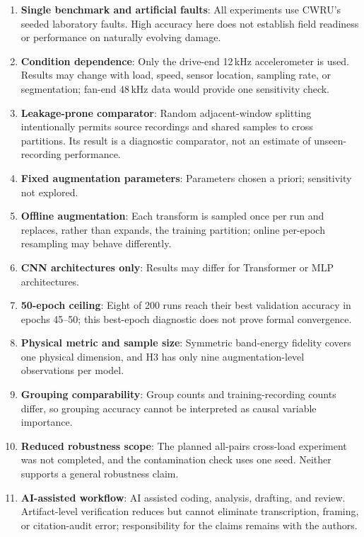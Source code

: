 ﻿\documentclass[11pt,a4paper]{article}
\begin{document}
\begin{enumerate}[nosep]
    \item \textbf{Single benchmark and artificial faults}: All experiments use CWRU's seeded laboratory faults. High accuracy here does not establish field readiness or performance on naturally evolving damage.
    \item \textbf{Condition dependence}: Only the drive-end 12\,kHz accelerometer is used. Results may change with load, speed, sensor location, sampling rate, or segmentation; fan-end 48\,kHz data would provide one sensitivity check.
    \item \textbf{Leakage-prone comparator}: Random adjacent-window splitting intentionally permits source recordings and shared samples to cross partitions. Its result is a diagnostic comparator, not an estimate of unseen-recording performance.
    \item \textbf{Fixed augmentation parameters}: Parameters chosen a priori; sensitivity not explored.
    \item \textbf{Offline augmentation}: Each transform is sampled once per run and replaces, rather than expands, the training partition; online per-epoch resampling may behave differently.
    \item \textbf{CNN architectures only}: Results may differ for Transformer or MLP architectures.
    \item \textbf{50-epoch ceiling}: Eight of 200 runs reach their best validation accuracy in epochs 45--50; this best-epoch diagnostic does not prove formal convergence.
    \item \textbf{Physical metric and sample size}: Symmetric band-energy fidelity covers one physical dimension, and H3 has only nine augmentation-level observations per model.
    \item \textbf{Grouping comparability}: Group counts and training-recording counts differ, so grouping accuracy cannot be interpreted as causal variable importance.
    \item \textbf{Reduced robustness scope}: The planned all-pairs cross-load experiment was not completed, and the contamination check uses one seed. Neither supports a general robustness claim.
    \item \textbf{AI-assisted workflow}: AI assisted coding, analysis, drafting, and review. Artifact-level verification reduces but cannot eliminate transcription, framing, or citation-audit error; responsibility for the claims remains with the authors.
\end{enumerate}
\end{document}
